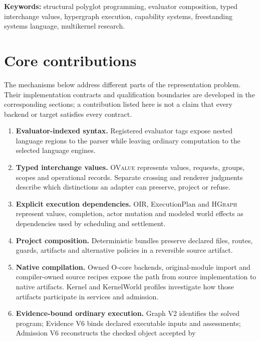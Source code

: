 \documentclass[11pt,oneside]{article}
\newcommand{\ovalue}{{\mdseries\textsc{OValue}}}
\newcommand{\oir}{{\mdseries\textsc{OIR}}}
\newcommand{\hgraph}{{\mdseries\textsc{HGraph}}}
\begin{document}
\vspace{0.15in}
\textbf{Keywords:} structural polyglot programming, evaluator composition,
typed interchange values, hypergraph execution, capability systems,
freestanding systems language, multikernel research.

\clearpage
\section*{Core contributions}

The mechanisms below address different parts of the representation problem.
Their implementation contracts and qualification boundaries are developed in
the corresponding sections; a contribution listed here is not a claim that
every backend or target satisfies every contract.

\begin{claimbox}
\begin{enumerate}
  \item \textbf{Evaluator-indexed syntax.} Registered evaluator tags expose
        nested language regions to the parser while leaving ordinary
        computation to the selected language engines.
  \item \textbf{Typed interchange values.} \ovalue{} represents values,
        requests, groups, scopes and operational records. Separate crossing
        and renderer judgments describe which distinctions an adapter can
        preserve, project or refuse.
  \item \textbf{Explicit execution dependencies.} \oir{}, ExecutionPlan and
        \hgraph{} represent values, completion, actor mutation and modeled
        world effects as dependencies used by scheduling and settlement.
  \item \textbf{Project composition.} Deterministic bundles preserve declared
        files, routes, guards, artifacts and alternative policies in a
        reversible source artifact.
  \item \textbf{Native compilation.} Owned O-core backends, original-module
        import and compiler-owned source recipes expose the path from source
        implementation to native artifacts. Kernel and KernelWorld profiles
        investigate how those artifacts participate in services and admission.
  \item \textbf{Evidence-bound ordinary execution.} Graph V2 identifies the
        solved program; Evidence V6 binds declared executable inputs and
        assessments; Admission V6 reconstructs the checked object accepted by

\end{enumerate}
\end{claimbox}
\end{document}
